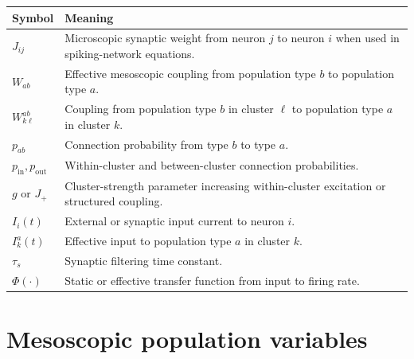 \begin{tabularx}{\textwidth}{@{}p{}X@{}}
\toprule
\textbf{Symbol} & \textbf{Meaning} \\
\midrule
$J_{ij}$ & Microscopic synaptic weight from neuron $j$ to neuron $i$ when used in spiking-network equations. \\
$W_{ab}$ & Effective mesoscopic coupling from population type $b$ to population type $a$. \\
$W_{k\ell}^{ab}$ & Coupling from population type $b$ in cluster $\ell$ to population type $a$ in cluster $k$. \\
$p_{ab}$ & Connection probability from type $b$ to type $a$. \\
$p_{\mathrm{in}},p_{\mathrm{out}}$ & Within-cluster and between-cluster connection probabilities. \\
$g$ or $J_+$ & Cluster-strength parameter increasing within-cluster excitation or structured coupling. \\
$I_i(t)$ & External or synaptic input current to neuron $i$. \\
$I_k^a(t)$ & Effective input to population type $a$ in cluster $k$. \\
$\tau_s$ & Synaptic filtering time constant. \\
$\Phi(\cdot)$ & Static or effective transfer function from input to firing rate. \\
\bottomrule
\end{tabularx}

\section{Mesoscopic population variables}
\label{app:notation-mesoscopic}

